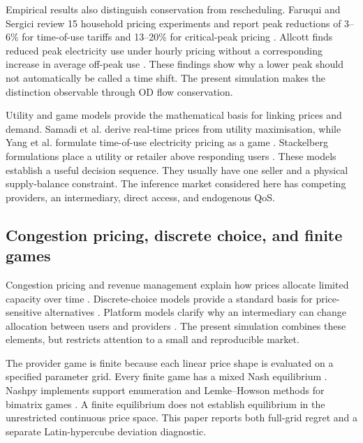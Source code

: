 \documentclass[11pt,a4paper]{article}
\begin{document}
Empirical results also distinguish conservation from rescheduling. Faruqui and Sergici review 15 household pricing experiments and report peak reductions of 3--6\% for time-of-use tariffs and 13--20\% for critical-peak pricing \cite{faruqui2010household}. Allcott finds reduced peak electricity use under hourly pricing without a corresponding increase in average off-peak use \cite{allcott2011rethinking}. These findings show why a lower peak should not automatically be called a time shift. The present simulation makes the distinction observable through OD flow conservation.

Utility and game models provide the mathematical basis for linking prices and demand. Samadi et al. derive real-time prices from utility maximisation, while Yang et al. formulate time-of-use electricity pricing as a game \cite{samadi2010optimal,yang2013game}. Stackelberg formulations place a utility or retailer above responding users \cite{yu2016supply,srinivasan2017game}. These models establish a useful decision sequence. They usually have one seller and a physical supply-balance constraint. The inference market considered here has competing providers, an intermediary, direct access, and endogenous QoS.

\subsection{Congestion pricing, discrete choice, and finite games}

Congestion pricing and revenue management explain how prices allocate limited capacity over time \cite{vickrey1969congestion,arnott1990bottleneck,gallego1994dynamic,elmaghraby2003dynamic}. Discrete-choice models provide a standard basis for price-sensitive alternatives \cite{mcfadden1974conditional,anderson1992discrete,train2009discrete}. Platform models clarify why an intermediary can change allocation between users and providers \cite{rochet2003platform}. The present simulation combines these elements, but restricts attention to a small and reproducible market.

The provider game is finite because each linear price shape is evaluated on a specified parameter grid. Every finite game has a mixed Nash equilibrium \cite{nash1951noncooperative,fudenberg1991game}. Nashpy implements support enumeration and Lemke--Howson methods for bimatrix games \cite{lemke1964equilibrium,knight2018nashpy}. A finite equilibrium does not establish equilibrium in the unrestricted continuous price space. This paper reports both full-grid regret and a separate Latin-hypercube deviation diagnostic.
\end{document}
